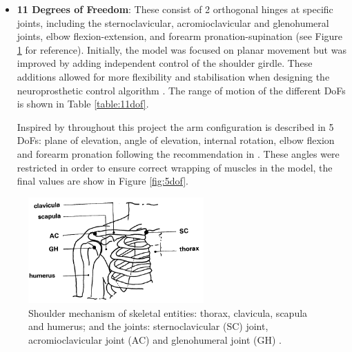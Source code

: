 \begin{itemize}
    \item \textbf{11 Degrees of Freedom}: These consist of 2 orthogonal hinges at specific joints, including the sternoclavicular, acromioclavicular and glenohumeral joints, elbow flexion-extension, and forearm pronation-supination (see Figure \ref{fig:measuring} for reference).  Initially, the model was focused on planar movement but was improved by adding independent control of the shoulder girdle. These additions allowed for more flexibility and stabilisation when designing the neuroprosthetic control algorithm \cite{RT3D}. The range of motion of the different DoFs is shown in Table \ref{table:11dof}.\newline
    
    Inspired by \cite{RT3D} throughout this project the arm configuration is described in 5 DoFs: plane of elevation, angle of elevation, internal rotation, elbow flexion and forearm pronation following the recommendation in \cite{ISB}. These angles were restricted in order to ensure correct wrapping of muscles in the model, the final values are show in Figure \ref{fig:5dof}.
\end{itemize}

\begin{figure}[h!]
    \centering
    \includegraphics[width=0.6\textwidth]{Pictures/DAS/Joints.png}
    \caption{Shoulder mechanism of skeletal entities: thorax, clavicula, scapula and humerus; and the joints: sternoclavicular (SC) joint, acromioclavicular joint (AC) and glenohumeral joint (GH) \cite{Measuringmuscleandjoint}. }
    \label{fig:measuring}
\end{figure}

